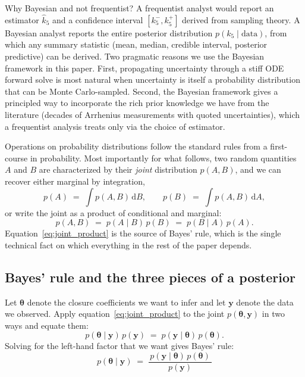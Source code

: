 \documentclass[12pt]{article}
\theoremstyle{plain}
\theoremstyle{definition}
\theoremstyle{remark}
\renewcommand{\d}{\mathrm{d}}
\begin{document}
\begin{tutorialbox}{Why Bayesian and not frequentist?}
A frequentist analyst would report an estimator $\hat k_5$ and a confidence
interval $[k_5^-, k_5^+]$ derived from sampling theory.  A Bayesian analyst
reports the entire posterior distribution $p(k_5\mid\mathrm{data})$, from
which any summary statistic (mean, median, credible interval, posterior
predictive) can be derived.  Two pragmatic reasons we use the Bayesian
framework in this paper.  First, propagating uncertainty through a stiff
ODE forward solve is most natural when uncertainty is itself a probability
distribution that can be Monte Carlo-sampled.  Second, the Bayesian
framework gives a principled way to incorporate the rich prior knowledge we
have from the literature (decades of Arrhenius measurements with quoted
uncertainties), which a frequentist analysis treats only via the choice of
estimator.
\end{tutorialbox}

Operations on probability distributions follow the standard rules from a
first-course in probability.  Most importantly for what follows, two random
quantities $A$ and $B$ are characterized by their \emph{joint} distribution
$p(A,B)$, and we can recover either marginal by integration,
%
\begin{equation}
  p(A) \;=\; \int p(A,B)\,\d B,
  \qquad
  p(B) \;=\; \int p(A,B)\,\d A,
\end{equation}
%
or write the joint as a product of conditional and marginal:
%
\begin{equation}
  p(A,B) \;=\; p(A\mid B)\,p(B) \;=\; p(B\mid A)\,p(A).
  \label{eq:joint_product}
\end{equation}
%
Equation~\eqref{eq:joint_product} is the source of Bayes' rule, which is the
single technical fact on which everything in the rest of the paper depends.

\subsection{Bayes' rule and the three pieces of a posterior}\label{sec:bg:bayes}

Let $\boldsymbol{\theta}$ denote the closure coefficients we want to infer and
let $\mathbf{y}$ denote the data we observed.  Apply
equation~\eqref{eq:joint_product} to the joint $p(\boldsymbol{\theta}, \mathbf{y})$
in two ways and equate them:
%
\begin{equation}
  p(\boldsymbol{\theta}\mid\mathbf{y})\,p(\mathbf{y})
  \;=\;
  p(\mathbf{y}\mid\boldsymbol{\theta})\,p(\boldsymbol{\theta}).
\end{equation}
%
Solving for the left-hand factor that we want gives Bayes' rule:
%
\begin{equation}
  \boxed{\;
    p(\boldsymbol{\theta}\mid\mathbf{y}) \;=\;
    \frac{\,p(\mathbf{y}\mid\boldsymbol{\theta})\,p(\boldsymbol{\theta})\,}{p(\mathbf{y})}
  \;}
  \label{eq:bayes}
\end{equation}
\end{document}
